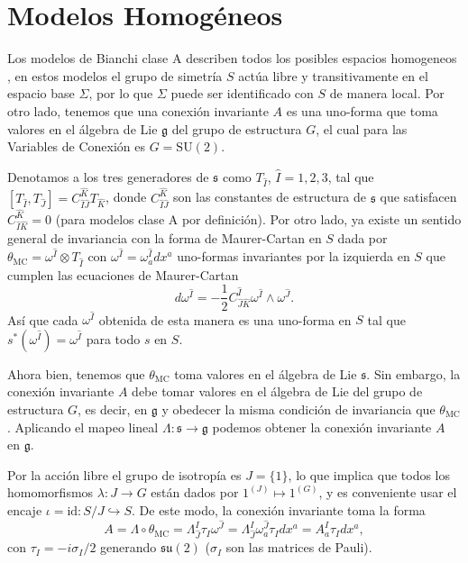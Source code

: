 \section{Modelos Homog\'{e}neos}

Los modelos de Bianchi clase A describen todos los posibles espacios homogeneos \cite{Wald}, en estos modelos el grupo de simetr\'{i}a $S$ act\'{u}a libre y transitivamente en el espacio base $\Sigma$, por lo que $\Sigma$ puede ser identificado con $S$ de manera local. Por otro lado, tenemos que una conexi\'{o}n invariante $A$ es una uno-forma que toma valores en el \'{a}lgebra de Lie $\mathfrak{g}$ del grupo de estructura $G$, el cual para las Variables de Conexi\'{o}n es $G=\mathrm{SU}(2)$.

Denotamos a los tres generadores de $\mathfrak{s}$ como $T_{\hat{I}}$, $\hat{I}=1,2,3$, tal que $\left[ T_{\hat{I}}, T_{\hat{J}} \right] = C^{\hat{K}}_{\hat{I}\hat{J}} T_{\hat{K}}$, donde $C^{\hat{K}}_{\hat{I}\hat{J}}$ son las constantes de estructura de $\mathfrak{s}$ que satisfacen $C^{\hat{K}}_{\hat{I}\hat{K}} = 0$ (para modelos clase A por definici\'{o}n). Por otro lado, ya existe un sentido general de invariancia con la forma de Maurer-Cartan en $S$ dada por $\theta_{\mathrm{MC}} = \omega^{\hat{I}} \otimes T_{\hat{I}}$ con $\omega^{\hat{I}} = \omega^{\hat{I}}_{a} dx^{a}$ uno-formas invariantes por la izquierda en $S$ que cumplen las ecuaciones de Maurer-Cartan
%
\begin{equation}
d \omega^{\hat{I}} = -\frac{1}{2} C^{\hat{I}}_{\hat{J} \hat{K}} \omega^{\hat{I}} \wedge \omega^{\hat{J}}.
\end{equation}
%
As\'{i} que cada $\omega^{\hat{I}}$ obtenida de esta manera es una uno-forma en $S$ tal que $s^{*}(\omega^{\hat{I}}) = \omega^{\hat{I}}$ para todo $s$ en $S$.

Ahora bien, tenemos que $\theta_{\mathrm{MC}}$ toma valores en el \'{a}lgebra de Lie $\mathfrak{s}$. Sin embargo, la conexi\'{o}n invariante $A$ debe tomar valores en el \'{a}lgebra de Lie del grupo de estructura $G$, es decir, en $\mathfrak{g}$ y obedecer la misma condici\'{o}n de invariancia que $\theta_{\mathrm{MC}}$. Aplicando el mapeo lineal $\Lambda: \mathfrak{s} \longrightarrow \mathfrak{g}$ podemos obtener la conexi\'{o}n invariante $A$ en $\mathfrak{g}$.

Por la acci\'{o}n libre el grupo de isotrop\'{i}a es $J=\{1\}$, lo que implica que todos los homomorfismos $\lambda: J \rightarrow G$ est\'{a}n dados por $1^{(J)} \longmapsto 1^{(G)}$, y es conveniente usar el encaje $\iota = \mathrm{id}: S/J \hookrightarrow S$. De este modo, la conexi\'{o}n invariante toma la forma
%
\begin{equation}
A = \Lambda \circ \theta_{\mathrm{MC}} = \Lambda^{I}_{\hat{J}} \tau_{I} \omega^{\hat{J}} =  \Lambda^{I}_{\hat{J}} \omega^{\hat{J}}_{a} \tau_{I} dx^{a}=A^{I}_{a} \tau_{I} dx^{a},
\end{equation}
%
con $\tau_{I} = -i \sigma_{I}/2$ generando $\mathfrak{su}(2)$ ($\sigma_{I}$ son las matrices de Pauli).

